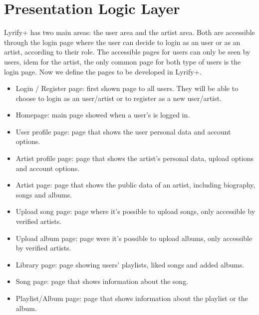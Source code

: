 \section{Presentation Logic Layer}


Lyrify+ has two main areas: the user area and the artist area. Both are accessible through the login page where the user can decide to login as an user or as an artist, according to their role. The accessible pages for users can only be seen by users, idem for the artist, the only common page for both type of users is the login page.
Now we define the pages to be developed in Lyrify+.
\begin{itemize}
    \item Login / Register page: first shown page to all users. They will be able to choose to login as an user/artist or to register as a new user/artist.
    \item Homepage: main page showed when a user's is logged in.
    \item User profile page: page that shows the user personal data and account options.
    \item Artist profile page: page that shows the artist's personal data, upload options and account options.
    \item Artist page: page that shows the public data of an artist, including biography, songs and albums.
    \item Upload song page: page where it's possible to upload songs, only accessible by verified artists.
    \item Upload album page: page were it's possible to upload albums, only accessible by verified artists.
    \item Library page: page showing users' playlists, liked songs and added albums.
    \item Song page: page that shows information about the song.
    \item Playlist/Album page: page that shows information about the playlist or the album.
\end{itemize}













\newpage









